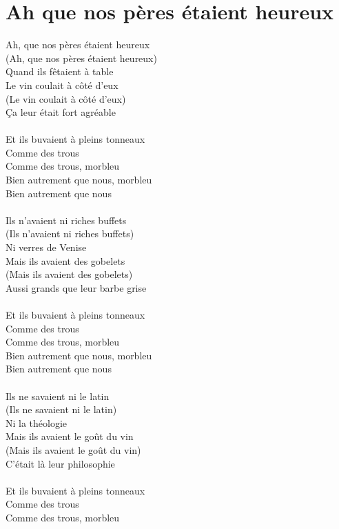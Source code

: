 \section*{Ah que nos pères étaient heureux}
Ah, que nos pères étaient heureux\\
(Ah, que nos pères étaient heureux)\\
Quand ils fêtaient à table\\
Le vin coulait à côté d'eux\\
(Le vin coulait à côté d'eux)\\
Ça leur était fort agréable\\\\
Et ils buvaient à pleins tonneaux\\
Comme des trous\\
Comme des trous, morbleu\\
Bien autrement que nous, morbleu\\
Bien autrement que nous\\\\
Ils n'avaient ni riches buffets\\
(Ils n'avaient ni riches buffets)\\
Ni verres de Venise\\
Mais ils avaient des gobelets\\
(Mais ils avaient des gobelets)\\
Aussi grands que leur barbe grise\\\\
Et ils buvaient à pleins tonneaux\\
Comme des trous\\
Comme des trous, morbleu\\
Bien autrement que nous, morbleu\\
Bien autrement que nous\\\\
Ils ne savaient ni le latin\\
(Ils ne savaient ni le latin)\\
Ni la théologie\\
Mais ils avaient le goût du vin\\
(Mais ils avaient le goût du vin)\\
C'était là leur philosophie\\\\
Et ils buvaient à pleins tonneaux\\
Comme des trous\\
Comme des trous, morbleu\\
